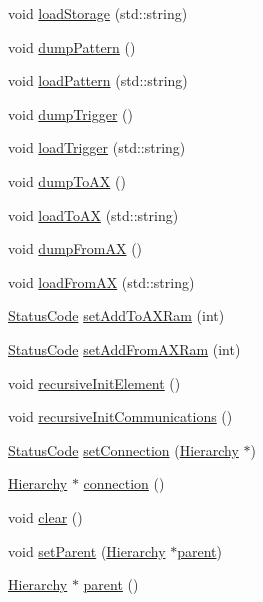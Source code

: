 \begin{DoxyCompactItemize}
void \hyperlink{classA3PE_a8bd4a7a5dd8219f93386756c24a0f0b5}{load\+Storage} (std\+::string)
\item 
void \hyperlink{classA3PE_a23da04d3c7e632dfb64e5ed4e21a21f3}{dump\+Pattern} ()
\item 
void \hyperlink{classA3PE_a522cba0a4d976eec59222504af188fb2}{load\+Pattern} (std\+::string)
\item 
void \hyperlink{classA3PE_aeab7701d0d1f6fd910e952b631769d42}{dump\+Trigger} ()
\item 
void \hyperlink{classA3PE_a34a9499a0d9065a1b5772880d7e8d5c4}{load\+Trigger} (std\+::string)
\item 
void \hyperlink{classA3PE_ad6b6f1ae4ac23e6d0827eee8cc2c98e4}{dump\+To\+AX} ()
\item 
void \hyperlink{classA3PE_a40017b4138705690f8b04e336a7ffcdf}{load\+To\+AX} (std\+::string)
\item 
void \hyperlink{classA3PE_a60a510251ec2b5fd800af2ba88e9fdac}{dump\+From\+AX} ()
\item 
void \hyperlink{classA3PE_a65235f7d42e8f7fb6056f5629545d2aa}{load\+From\+AX} (std\+::string)
\item 
\hyperlink{classStatusCode}{Status\+Code} \hyperlink{classA3PE_a54fe4da570ea8833fe2c981de1085387}{set\+Add\+To\+A\+X\+Ram} (int)
\item 
\hyperlink{classStatusCode}{Status\+Code} \hyperlink{classA3PE_a834fde5951d2c1bf6b41842520360fce}{set\+Add\+From\+A\+X\+Ram} (int)
\item 
void \hyperlink{classElement_a3c0abcb36f8906688bb7e32608df7086}{recursive\+Init\+Element} ()
\item 
void \hyperlink{classElement_a82119ed37dff76508a2746a853ec35ba}{recursive\+Init\+Communications} ()
\item 
\hyperlink{classStatusCode}{Status\+Code} \hyperlink{classElement_ab476b4b1df5954141ceb14f072433b89}{set\+Connection} (\hyperlink{classHierarchy}{Hierarchy} $\ast$)
\item 
\hyperlink{classHierarchy}{Hierarchy} $\ast$ \hyperlink{classElement_af57444353c1ddf9fa0109801e97debf7}{connection} ()
\item 
void \hyperlink{classHierarchy_af4d43b0765b402670eed2d62c73405af}{clear} ()
\item 
void \hyperlink{classHierarchy_a585ad1aeec16077a0e532ab8b4fc557b}{set\+Parent} (\hyperlink{classHierarchy}{Hierarchy} $\ast$\hyperlink{classHierarchy_a1c7bec8257e717f9c1465e06ebf845fc}{parent})
\item 
\hyperlink{classHierarchy}{Hierarchy} $\ast$ \hyperlink{classHierarchy_a1c7bec8257e717f9c1465e06ebf845fc}{parent} ()

\end{DoxyCompactItemize}
